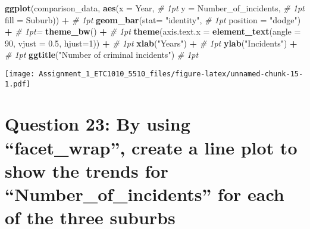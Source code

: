 \documentclass[
]{article}
\newenvironment{Shaded}{\begin{snugshade}}{\end{snugshade}}
\newcommand{\CommentTok}[1]{\textcolor[rgb]{0.56,0.35,0.01}{\textit{#1}}}
\newcommand{\DataTypeTok}[1]{\textcolor[rgb]{0.13,0.29,0.53}{#1}}
\newcommand{\DecValTok}[1]{\textcolor[rgb]{0.00,0.00,0.81}{#1}}
\newcommand{\FloatTok}[1]{\textcolor[rgb]{0.00,0.00,0.81}{#1}}
\newcommand{\KeywordTok}[1]{\textcolor[rgb]{0.13,0.29,0.53}{\textbf{#1}}}
\newcommand{\NormalTok}[1]{#1}
\newcommand{\OperatorTok}[1]{\textcolor[rgb]{0.81,0.36,0.00}{\textbf{#1}}}
\newcommand{\StringTok}[1]{\textcolor[rgb]{0.31,0.60,0.02}{#1}}
\begin{document}
\begin{Shaded}
\begin{Highlighting}[]
\KeywordTok{ggplot}\NormalTok{(comparison_data, }\KeywordTok{aes}\NormalTok{(}\DataTypeTok{x =}\NormalTok{ Year,    }\CommentTok{# 1pt}
                            \DataTypeTok{y =}\NormalTok{ Number_of_incidents,  }\CommentTok{# 1pt}
                            \DataTypeTok{fill =}\NormalTok{ Suburb)) }\OperatorTok{+}\StringTok{   }\CommentTok{# 1pt}
\StringTok{  }\KeywordTok{geom_bar}\NormalTok{(}\DataTypeTok{stat=} \StringTok{"identity"}\NormalTok{,    }\CommentTok{# 1pt}
             \DataTypeTok{position =} \StringTok{"dodge"}\NormalTok{) }\OperatorTok{+}\StringTok{  }\CommentTok{# 1pt=}
\StringTok{  }\KeywordTok{theme_bw}\NormalTok{() }\OperatorTok{+}\StringTok{  }\CommentTok{# 1pt}
\StringTok{  }\KeywordTok{theme}\NormalTok{(}\DataTypeTok{axis.text.x =} \KeywordTok{element_text}\NormalTok{(}\DataTypeTok{angle =} \DecValTok{90}\NormalTok{, }\DataTypeTok{vjust =} \FloatTok{0.5}\NormalTok{, }\DataTypeTok{hjust=}\DecValTok{1}\NormalTok{)) }\OperatorTok{+}\StringTok{   }\CommentTok{# 1pt}
\StringTok{  }\KeywordTok{xlab}\NormalTok{(}\StringTok{"Years"}\NormalTok{) }\OperatorTok{+}\StringTok{   }\CommentTok{# 1pt}
\StringTok{ }\KeywordTok{ylab}\NormalTok{(}\StringTok{"Incidents"}\NormalTok{) }\OperatorTok{+}\StringTok{   }\CommentTok{# 1pt}
\StringTok{  }\KeywordTok{ggtitle}\NormalTok{(}\StringTok{"Number of criminal incidents"}\NormalTok{)  }\CommentTok{# 1pt}
\end{Highlighting}
\end{Shaded}

\texttt{[image: Assignment\_1\_ETC1010\_5510\_files/figure-latex/unnamed-chunk-15-1.pdf]}

\hypertarget{question-23-by-using-facet_wrap-create-a-line-plot-to-show-the-trends-for-number_of_incidents-for-each-of-the-three-suburbs}{%
\section{Question 23: By using ``facet\_wrap'', create a line plot to
show the trends for ``Number\_of\_incidents'' for each of the three
suburbs}\label{question-23-by-using-facet_wrap-create-a-line-plot-to-show-the-trends-for-number_of_incidents-for-each-of-the-three-suburbs}}
\end{document}
